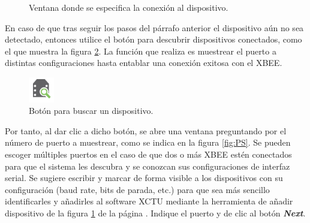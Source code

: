 \begin{figure}[H] %
\caption{Ventana donde se especifica la conexión al dispositivo.}
\label{fig:AddW}
\end{figure}

En caso de que tras seguir los pasos del párrafo anterior el dispositivo aún no sea detectado, entonces utilice el botón para descubrir dispositivos conectados, como el que muestra la figura \ref{fig:SearchDev}. La función que realiza es muestrear el puerto a distintas configuraciones hasta entablar una conexión exitosa con el XBEE.

\begin{figure} %
    \centering
    \includegraphics[width=0.10\textwidth]{Figures/XCTU/SearchDevice}
    \caption{Botón para buscar un dispositivo.}
    \label{fig:SearchDev}
\end{figure}

Por tanto, al dar clic a dicho botón, se abre una ventana preguntando por el número de puerto a muestrear, como se indica en la figura \ref{fig:PS}. Se pueden escoger múltiples puertos en el caso de que dos o más XBEE estén conectados para que el sistema les descubra y se conozcan sus configuraciones de interfaz serial. Se sugiere escribir y marcar de forma visible a los dispositivos con su configuración (baud rate, bits de parada, etc.) para que sea más sencillo identificarles y añadirles al software XCTU mediante la herramienta de añadir dispositivo de la figura \ref{fig:AddW} de la página \pageref{fig:AddW}. Indique el puerto y de clic al botón \textit{\textbf{Next}}.

